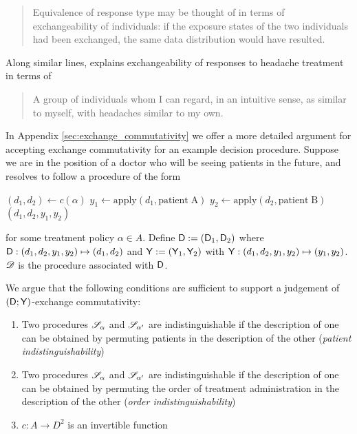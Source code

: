 \begin{quote}
    Equivalence of response type may be thought of in terms of exchangeability of individuals: if the exposure states of the two individuals had been exchanged, the same data distribution would have resulted.
\end{quote}

Along similar lines, \citet{dawid_decision-theoretic_2020} explains exchangeability of responses to headache treatment in terms of

\begin{quote}
    A group of individuals whom I can regard, in an intuitive sense, as similar to myself, with headaches similar to my own.
\end{quote}

In Appendix \ref{sec:exchange_commutativity} we offer a more detailed argument for accepting exchange commutativity for an example decision procedure. Suppose we are in the position of a doctor who will be seeing patients in the future, and resolves to follow a procedure of the form

\begin{algorithmic}
    \State $(d_1,d_2) \gets c(\alpha)$
    \State $y_1\gets \mathrm{apply}(d_1,\mathrm{patient\;A})$
    \State $y_2\gets \mathrm{apply}(d_2,\mathrm{patient\;B})$
    \State \Return $(d_1,d_2,y_1,y_2)$
    \EndProcedure
\end{algorithmic}

for some treatment policy $\alpha\in A$. Define $\mathsf{D}:=(\mathsf{D}_1,\mathsf{D}_2)$ where $\mathsf{D}:(d_1,d_2,y_1,y_2)\mapsto (d_1,d_2)$ and $\mathsf{Y}:=(\mathsf{Y}_1,\mathsf{Y}_2)$ with $\mathsf{Y}:(d_1,d_2,y_1,y_2)\mapsto (y_1,y_2)$. $\mathscr{D}$ is the procedure associated with $\mathsf{D}$.

We argue that the following conditions are sufficient to support a judgement of $(\mathsf{D};\mathsf{Y})$-exchange commutativity:

\begin{enumerate}
    \item Two procedures $\mathscr{S}_\alpha$ and $\mathscr{S}_{\alpha'}$ are indistinguishable if the description of one can be obtained by permuting patients in the description of the other (\emph{patient indistinguishability})
    \item Two procedures $\mathscr{S}_\alpha$ and $\mathscr{S}_{\alpha'}$ are indistinguishable if the description of one can be obtained by permuting the order of treatment administration in the description of the other (\emph{order indistinguishability})
    \item $c:A\to D^2$ is an invertible function
\end{enumerate}

